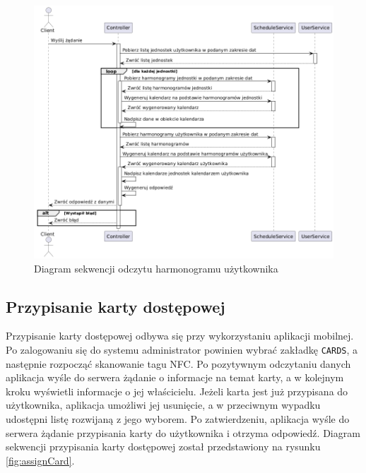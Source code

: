 \begin{figure}[H]
    \centering
    \includegraphics[width=\textwidth]{graf/schSeq.png}
    \caption{Diagram sekwencji odczytu harmonogramu użytkownika}
    \label{fig:scheduleSequence}
\end{figure}

\subsection{Przypisanie  karty dostępowej}
\label{sec:addNfc}

Przypisanie karty dostępowej odbywa się przy wykorzystaniu aplikacji mobilnej. Po zalogowaniu się do systemu administrator powinien wybrać zakładkę \texttt{CARDS}, a następnie rozpocząć skanowanie tagu NFC. Po pozytywnym odczytaniu danych aplikacja wyśle do serwera żądanie o informacje na temat karty, a w kolejnym kroku wyświetli informacje o jej właścicielu. Jeżeli karta jest już przypisana do użytkownika, aplikacja umożliwi jej usunięcie, a w przeciwnym wypadku udostępni listę rozwijaną z jego wyborem. Po zatwierdzeniu, aplikacja wyśle do serwera żądanie przypisania karty do użytkownika i otrzyma odpowiedź. Diagram sekwencji przypisania karty dostępowej został przedstawiony na rysunku \ref{fig:assignCard}.

